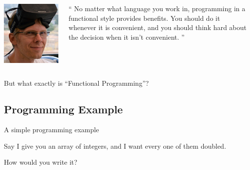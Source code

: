 \documentclass[mathserif]{beamer}
\begin{document}
\begin{frame}

  \begin{columns}[t]
    \begin{column}[T]{2cm}
      \includegraphics[scale=0.2]{img/john_carmack.jpg}
    \end{column}

    \begin{column}[T]{8cm}
      \begin{exampleblock}{}
        {\Large ``
          No matter what language you work in, programming
          in a functional style provides benefits.
          You should do it whenever it is convenient, and you
          should think hard about the decision when it isn’t convenient.
          ''}
        \vskip5mm
        \hspace*{}
      \end{exampleblock}
    \end{column}
  \end{columns}
\end{frame}

\begin{frame}

  \begin{center}
  {\Huge But what exactly is ``Functional Programming''?}
  \end{center}

\end{frame}

\subsection{Programming Example}
\begin{frame}{A simple programming example}

  {\Large Say I give you an array of integers,
    and I want every one of them doubled.

    \vskip5mm

    How would you write it?}

\end{frame}
\end{document}
